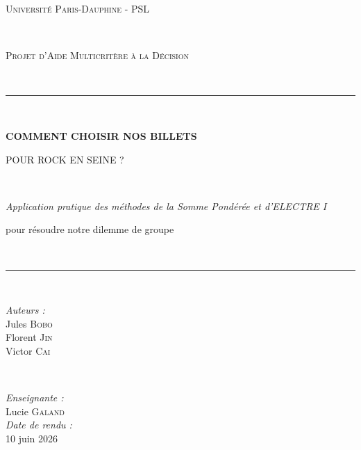 \documentclass[11pt,a4paper]{article}
\begin{document}
\begin{titlepage}
    \centering
    \vspace*{1.5cm}
    
    {\large\scshape Université Paris-Dauphine - PSL\par}\\[0.5cm]
    {\large\scshape Projet d'Aide Multicritère à la Décision\par}\\[1.5cm]
    
    \rule{\linewidth}{0.8mm}\\[0.6cm]
    {\huge\bfseries COMMENT CHOISIR NOS BILLETS\par\vspace{0.2cm} POUR ROCK EN SEINE ?\par}\\[0.6cm]
    {\large\itshape Application pratique des méthodes de la Somme Pondérée et d'ELECTRE I\par\vspace{0.2cm} pour résoudre notre dilemme de groupe\par}\\[0.6cm]
    \rule{\linewidth}{0.8mm}\\[2.5cm]
    
    \begin{minipage}{0.45\textwidth}
        \begin{flushleft} \large
            \emph{Auteurs :}\\
            Jules \textsc{Bobo}\\
            Florent \textsc{Jin}\\
            Victor \textsc{Cai}
        \end{flushleft}
    \end{minipage}
    ~
    \begin{minipage}{0.45\textwidth}
        \begin{flushright} \large
            \emph{Enseignante :} \\
            Lucie \textsc{Galand}\\
            \vspace{0.4cm}
            \emph{Date de rendu :} \\
            10 juin 2026
        \end{flushright}
    \end{minipage}
    
    \vfill
    

\end{titlepage}
\end{document}
